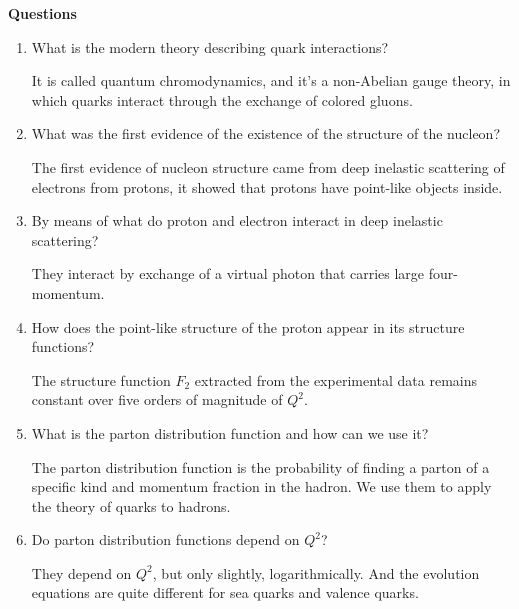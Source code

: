 \documentclass[a4paper, 12pt]{article}
\begin{document}
\begin{center}
	\textbf{Questions}
\end{center}
\begin{enumerate}
	\item What is the modern theory describing quark interactions?

		It is called quantum chromodynamics, and it's a non-Abelian 
		gauge theory, in which quarks interact through the exchange 
		of colored gluons.

	\item What was the first evidence of the existence of 
		the structure of the nucleon?

		The first evidence of nucleon structure came from deep 
		inelastic scattering of electrons from protons, it showed 
		that protons have point-like objects inside.

	\item By means of what do proton and electron interact in 
		deep inelastic scattering?

		They interact by exchange of a virtual photon that carries 
		large four-momentum.

	\item How does the point-like structure of the proton appear 
		in its structure functions?

		The structure function $F_2$ extracted from the 
		experimental data remains constant over five orders of 
		magnitude of $Q^2$.

	\item What is the parton distribution function and how can we 
		use it?

		The parton distribution function is the probability of 
		finding a parton of a specific kind and momentum fraction 
		in the hadron. We use them to apply the theory of quarks 
		to hadrons.

	\item Do parton distribution functions depend on $Q^2$?

		They depend on $Q^2$, but only slightly, logarithmically. 
		And the evolution equations are quite different for sea 
		quarks and valence quarks.
\end{enumerate}
\end{document}
